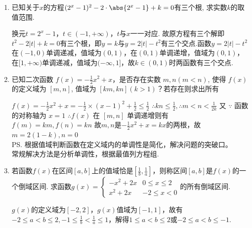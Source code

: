 \begin{enumerate}
\begin{jieda}
    \end{jieda}
    \begin{vspace_}
    \vsp[5]
    \end{vspace_}
    \item 已知关于$x$的方程$(2^x-1)^2-2\cdot\abs{2^x-1}+k=0$有三个根, 求实数$k$的取值范围. 
    \begin{jieda}
        换元$t = 2^x - 1$，$t \in (-1, +\infty)$，$t$与$x$一一对应. 故原方程有三个解即$t^2 - 2|t| + k = 0$有三个根，即$y = k$与$y = 2|t| - t^2$有三个交点.函数$y = 2|t| - t^2$在$(-1, 0)$单调递减，值域为$(0, 1)$，在$(0, 1)$单调递增，值域为$(0, 1)$，在$[1, +\infty)$单调递减，值域为$(-\infty, 1]$，故$k \in (0, 1)$时两函数有三个交点.
    \end{jieda}
    \clearpage
    \item 已知二次函数 $f(x)=-\frac{1}{2} x^2+x$，是否存在实数 $m, n(m<n)$, 使得 $f(x)$ 的定义域为 $[m, n]$, 值域为 $[k m, k n](k>1)$？若存在则求出所有
    \begin{jieda}
    $f(x)=-\frac{1}{2} x^2+x=-\frac{1}{2} \times(x-1)^2+\frac{1}{2} \leq \frac{1}{2}$
    $\therefore k n \leq \frac{1}{2}, \therefore m<n<\frac{1}{2k}$
    又 $\because$ 函数的对称轴为 $x=1$
    $\therefore f(x)$ 在 $[m, n]$ 单调递增则有 $f(m)=k m, f(n)=k n$
    故$m, n$是$-\frac{1}{2}x^2 + x = kx$的两根，故$m = 2(1-k), n = 0$ \\
    \ps 根据值域判断函数在定义域内的单调性是简化，解决问题的突破口。\\
    常规解决方法是分析单调性，根据最值列方程组.
    \end{jieda}
    \begin{vspace_}
    \vsp[5]
    \end{vspace_}
    \item 若函数$f(x)$在区间$[a, b]$上的值域恰是$[\frac{1}{b}, \frac{1}{a}]$，则称区间$[a, b]$是$f(x)$的一个倒域区间. 求函数$g(x) = \left \{ \begin{array}{ll}
        -x^2+2x & 0 \leq x \leq 2 \\
        x^2 + 2x & -2 \leq x < 0
    \end{array}\right.$的所有倒域区间.
    \begin{jieda}
        $g(x)$的定义域为$[-2, 2]$，$g(x)$值域为$[-1, 1]$，故有$-2 \leq a < b \leq 2, -1 \leq \frac{1}{b} < \frac{1}{a} \leq 1$，解得$1 \leq a < b \leq 2$或$-2 \leq a < b \leq -1$.
\end{jieda}
\end{enumerate}
